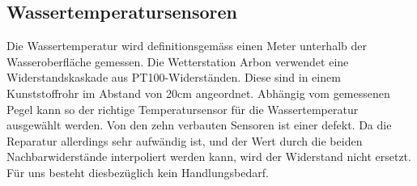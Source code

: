 \subsection{Wassertemperatursensoren}
Die Wassertemperatur wird definitionsgemäss einen Meter unterhalb der Wasseroberfläche gemessen. Die Wetterstation Arbon verwendet eine Widerstandskaskade aus PT100-Widerständen. Diese sind in einem Kunststoffrohr im Abstand von 20cm angeordnet. Abhängig vom gemessenen Pegel kann so der richtige Temperatursensor für die Wassertemperatur ausgewählt werden. Von den zehn verbauten Sensoren ist einer defekt. Da die Reparatur allerdings sehr aufwändig ist, und der Wert durch die beiden Nachbarwiderstände interpoliert werden kann, wird der Widerstand nicht ersetzt. Für uns besteht diesbezüglich kein Handlungsbedarf.













